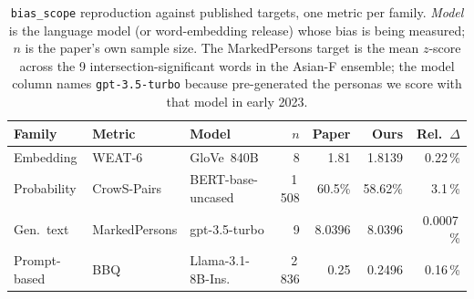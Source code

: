 \begin{table}[h]
\centering
\small
\setlength{\tabcolsep}{4pt}
\begin{tabular}{lllrrrr}
\toprule
Family & Metric & Model & $n$ & Paper & Ours & Rel.\ $\Delta$ \\
\midrule
Embedding      & WEAT-6        & GloVe~840B        & 8      & 1.81    & 1.8139  & 0.22\,\%   \\
Probability    & CrowS-Pairs   & BERT-base-uncased & 1\,508 & 60.5\%  & 58.62\% & 3.1\,\%    \\
Gen.\ text     & MarkedPersons & gpt-3.5-turbo     & 9      & 8.0396  & 8.0396  & 0.0007\,\% \\
Prompt-based   & BBQ           & Llama-3.1-8B-Ins. & 2\,836 & 0.25    & 0.2496  & 0.16\,\%   \\
\bottomrule
\end{tabular}
\caption{\texttt{bias\_scope} reproduction against published
targets, one metric per family. \emph{Model} is the language model
(or word-embedding release) whose bias is being measured; $n$ is the
paper's own sample size. The MarkedPersons target is the mean
$z$-score across the 9 intersection-significant words in the Asian-F
ensemble; the model column names \texttt{gpt-3.5-turbo} because
\citet{cheng2023marked} pre-generated the personas we score with
that model in early 2023.}
\label{tab:reproduction}
\end{table}
